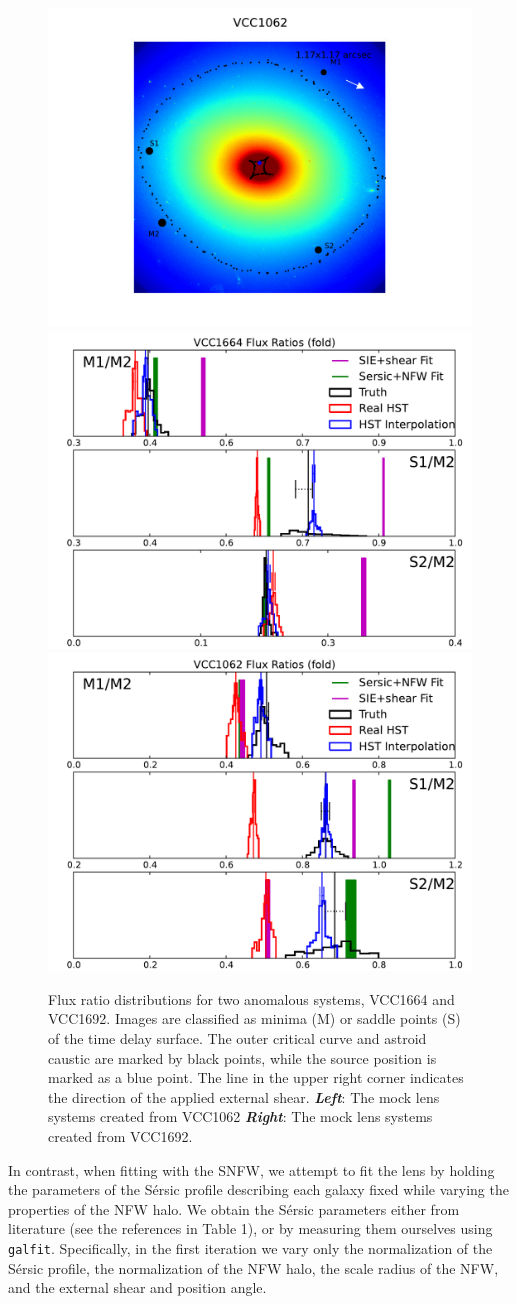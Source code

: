 \begin{figure}
	\includegraphics[trim=3cm 0cm 3cm 0cm,clip,width=.24\textwidth]{./figures_sls/kappamap_VCC1062_fold_withshear-eps-converted-to.pdf}
	\includegraphics[clip,trim=.85cm 0cm .1cm
	0cm,width=0.48\linewidth,keepaspectratio]{./figures_sls/VCC1664_fold_fluxratios-eps-converted-to.pdf}
	\includegraphics[clip,trim=.9cm 0cm .2cm
	0cm,width=0.48\linewidth,keepaspectratio]{./figures_sls/VCC1062_fold_fluxratios-eps-converted-to.pdf}
	\caption[Flux ratio pdfs and mass maps of VCC1664 and VCC1062]{\label{fig:fluxratios2} Flux ratio distributions for two anomalous systems, VCC1664 and VCC1692. Images are classified as minima (M) or saddle points (S) of the time delay surface. The outer critical curve and astroid caustic are marked by black points, while the source position is marked as a blue point. The line in the upper right corner indicates the direction of the applied external shear. {\bf{\emph{Left}}}: The mock lens systems created from VCC1062 {\bf{\emph{Right}}}: The mock lens systems created from VCC1692.} 
\end{figure}
In contrast, when fitting with the SNFW, we attempt to fit the lens by holding the parameters of the S{\'e}rsic profile describing each galaxy fixed while varying the properties of the NFW halo. We obtain the S{\'e}rsic parameters either from literature (see the references in Table 1), or by measuring them ourselves using {\tt {galfit}}. Specifically, in the first iteration we vary only the normalization of the S{\'e}rsic profile, the normalization of the NFW halo, the scale radius of the NFW, and the external shear and position angle. 

